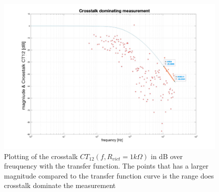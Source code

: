 \documentclass[
	a4paper,
	11pt,
]{article}
\begin{document}
\begin{figure}[htb!]
    \centerline{\includegraphics[width=14cm]{figure/A67/a7_CT_dominates.jpeg}}
    \caption{Plotting of the crosstalk \(CT_{12} (f, R_{vict}= 1k\Omega)\) in dB over freuquency with the transfer function. The points that has a larger magnitude compared to the transfer function curve is the range  does crosstalk dominate the measurement}
    \label{fig:A7_cross}
\end{figure}
\end{document}
